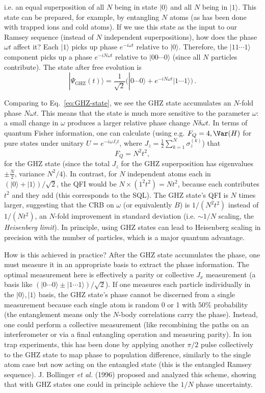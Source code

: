 i.e. an equal superposition of all $N$ being in state $|0\rangle$ and
all $N$ being in $|1\rangle$. This state can be prepared, for example,
by entangling $N$ atoms (as has been done with trapped ions and cold
atoms). If we use this state as the input to our Ramsey sequence
(instead of $N$ independent superpositions), how does the phase
$\omega t$ affect it? Each $|1\rangle$ picks up phase $e^{-i\omega t}$
relative to $|0\rangle$. Therefore, the $|11\cdots1\rangle$ component
picks up a phase $e^{-i N \omega t}$ relative to $|00\cdots0\rangle$
(since all $N$ particles contribute). The state after free evolution
is
\[
|\Psi_{\text{GHZ}}(t)\rangle = \frac{1}{\sqrt{2}}\Big(|0\cdots0\rangle + e^{-i N \omega t} |1\cdots1\rangle\Big) \,.
\]

Comparing to Eq.~\eqref{eq:GHZ-state}, we see the GHZ state
accumulates an $N$-fold phase $N\omega t$. This means that the state
is much more sensitive to the parameter $\omega$: a small change in
$\omega$ produces a larger relative phase change $N\delta\omega t$. In
terms of quantum Fisher information, one can calculate (using
e.g. $F_Q = 4,\Var(H)$ for pure states under unitary $U=e^{-i\omega
  J_z t}$, where $J_z = \frac{1}{2}\sum_{k=1}^N \sigma^{(k)}_z$) that
\[
F_Q = N^2 t^2,
\]
for the GHZ state (since the total $J_z$ for the GHZ superposition has
eigenvalues $\pm \frac{N}{2}$, variance $N^2/4$). In contrast, for $N$
independent atoms each in $(|0\rangle+|1\rangle)/\sqrt{2}$, the QFI
would be $N \times (1^2 t^2) = N t^2$, because each contributes $t^2$
and they add (this corresponds to the SQL). The GHZ state’s QFI is $N$
times larger, suggesting that the CRB on $\omega$ (or equivalently
$B$) is $1/(N^2 t^2)$ instead of $1/(N t^2)$, an $N$-fold improvement
in standard deviation (i.e. $\sim 1/N$ scaling, the \textit{Heisenberg
  limit}). In principle, using GHZ states can lead to Heisenberg
scaling in precision with the number of particles, which is a major
quantum advantage.



How is this achieved in practice? After the GHZ state accumulates the
phase, one must measure it in an appropriate basis to extract the
phase information. The optimal measurement here is effectively a
parity or collective $J_x$ measurement (a basis like
$(|0\cdots0\rangle \pm |1\cdots1\rangle)/\sqrt{2}$). If one measures
each particle individually in the ${|0\rangle,|1\rangle}$ basis, the
GHZ state’s phase cannot be discerned from a single measurement
because each single atom is random 0 or 1 with $50\%$ probability (the
entanglement means only the $N$-body correlations carry the
phase). Instead, one could perform a collective measurement (like
recombining the paths on an interferometer or via a final entangling
operation and measuring parity). In ion trap experiments, this has
been done by applying another $\pi/2$ pulse collectively to the GHZ
state to map phase to population difference, similarly to the single
atom case but now acting on the entangled state (this is the entangled
Ramsey sequence). J. Bollinger \textit{et al.} (1996)
\cite{Bollinger1996} proposed and analyzed this scheme, showing that
with GHZ states one could in principle achieve the $1/N$ phase
uncertainty.



